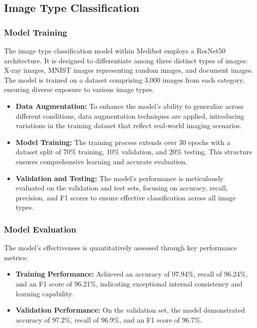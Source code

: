 \subsection{Image Type Classification}

\subsubsection{Model Training}

The image type classification model within Medibot employs a ResNet50 architecture. It is designed to differentiate among three distinct types of images: X-ray images, MNIST images representing random images, and document images. The model is trained on a dataset comprising 3,000 images from each category, ensuring diverse exposure to various image types.

\begin{itemize}
    \item \textbf{Data Augmentation:} To enhance the model's ability to generalize across different conditions, data augmentation techniques are applied, introducing variations in the training dataset that reflect real-world imaging scenarios.
    \item \textbf{Model Training:} The training process extends over 30 epochs with a dataset split of 70\% training, 10\% validation, and 20\% testing. This structure ensures comprehensive learning and accurate evaluation.
    \item \textbf{Validation and Testing:} The model's performance is meticulously evaluated on the validation and test sets, focusing on accuracy, recall, precision, and F1 scores to ensure effective classification across all image types.
\end{itemize}

\subsubsection{Model Evaluation}

The model's effectiveness is quantitatively assessed through key performance metrics:

\begin{itemize}
    \item \textbf{Training Performance:} Achieved an accuracy of 97.94\%, recall of 96.24\%, and an F1 score of 96.21\%, indicating exceptional internal consistency and learning capability.
    \item \textbf{Validation Performance:} On the validation set, the model demonstrated accuracy of 97.2\%, recall of 96.9\%, and an F1 score of 96.7\%.
\end{itemize}

